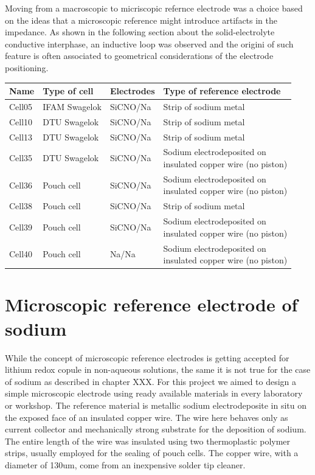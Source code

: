 Moving from a macroscopic to micriscopic refernce electrode was a choice based on the ideas that a microscopic reference might introduce artifacts in the impedance. As shown in the following section about the solid-electrolyte conductive interphase, an inductive loop was observed and the origini of such feature is often associated to geometrical considerations of the electrode positioning.

\begin{table}
\centering

\begin{tabular}{l l l l}
\toprule
\textbf{Name} & \textbf{Type of cell} & \textbf{Electrodes} & \textbf{Type of reference electrode} \\
\toprule
Cell05 & IFAM Swagelok & SiCNO/Na & Strip of sodium metal \\
Cell10 & DTU Swagelok & SiCNO/Na & Strip of sodium metal \\
Cell13 & DTU Swagelok & SiCNO/Na & Strip of sodium metal \\
Cell35 & DTU Swagelok & SiCNO/Na & \thead[l]{Sodium electrodeposited on \\insulated copper wire (no piston) }\\
Cell36 & Pouch cell & SiCNO/Na & \thead[l]{Sodium electrodeposited on \\insulated copper wire (no piston) } \\
Cell38 & Pouch cell & SiCNO/Na & Strip of sodium metal \\
Cell39 & Pouch cell & SiCNO/Na & \thead[l]{Sodium electrodeposited on \\insulated copper wire (no piston) } \\
Cell40 & Pouch cell & Na/Na & \thead[l]{Sodium electrodeposited on \\insulated copper wire (no piston) } \\
\bottomrule

\end{tabular}

\end{table}


\section{Microscopic reference electrode of sodium}

 While the concept of microscopic reference electrodes is getting accepted for lithium redox copule   in non-aqueous solutions, the same it is not true for the case of sodium as described in chapter XXX. For this project we aimed to design a simple microscopic electrode using ready available materials in every laboratory or workshop. The reference material is metallic sodium electrodeposite in situ on the exposed face of an insulated copper wire. The wire here behaves only as current collector and mechanically strong substrate for the deposition of sodium. The entire length of the wire was insulated using two thermoplastic polymer strips, usually employed for the sealing of pouch cells. The copper wire, with a diameter of 130um, come from an inexpensive solder tip cleaner. 

